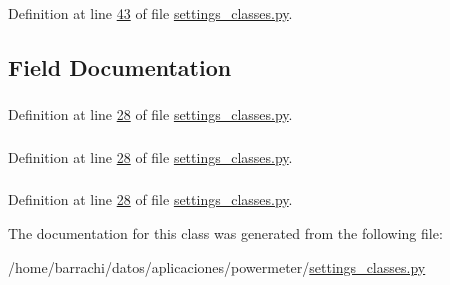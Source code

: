 \-Definition at line \hyperlink{settings__classes_8py_source_l00043}{43} of file \hyperlink{settings__classes_8py_source}{settings\-\_\-classes.\-py}.



\subsection{\-Field \-Documentation}
\hypertarget{classsettings__classes_1_1_computer_aa4b88f24716e66e8d41400b00e8ae8ae}{
\subsubsection[{devices}]{}}\label{classsettings__classes_1_1_computer_aa4b88f24716e66e8d41400b00e8ae8ae}


\-Definition at line \hyperlink{settings__classes_8py_source_l00028}{28} of file \hyperlink{settings__classes_8py_source}{settings\-\_\-classes.\-py}.

\hypertarget{classsettings__classes_1_1_computer_afd65cf072a93c93ad52b9f25b341e10b}{
\subsubsection[{ip}]{}}\label{classsettings__classes_1_1_computer_afd65cf072a93c93ad52b9f25b341e10b}


\-Definition at line \hyperlink{settings__classes_8py_source_l00028}{28} of file \hyperlink{settings__classes_8py_source}{settings\-\_\-classes.\-py}.

\hypertarget{classsettings__classes_1_1_computer_ab74e6bf80237ddc4109968cedc58c151}{
\subsubsection[{name}]{}}\label{classsettings__classes_1_1_computer_ab74e6bf80237ddc4109968cedc58c151}


\-Definition at line \hyperlink{settings__classes_8py_source_l00028}{28} of file \hyperlink{settings__classes_8py_source}{settings\-\_\-classes.\-py}.



\-The documentation for this class was generated from the following file\-:\begin{DoxyCompactItemize}
\item 
/home/barrachi/datos/aplicaciones/powermeter/\hyperlink{settings__classes_8py}{settings\-\_\-classes.\-py}\end{DoxyCompactItemize}
